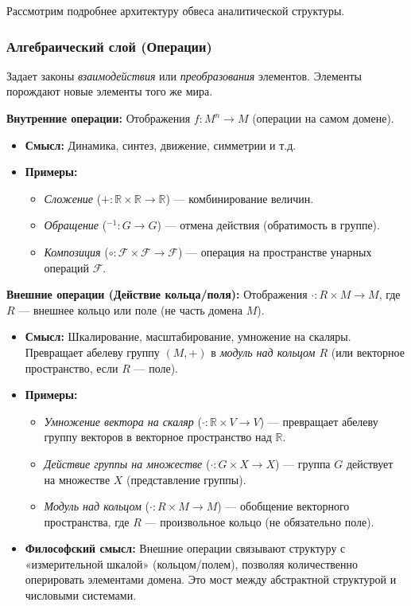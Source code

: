 \documentclass[11pt, a4paper]{extarticle}
\newcommand{\Fcal}{{\mathcal F}}
\newcommand{\R}{{\mathbb R}}
\begin{document}
Рассмотрим подробнее архитектуру обвеса аналитической структуры.

\subsubsection{Алгебраический слой (Операции)}
Задает законы \textit{взаимодействия} или \textit{преобразования} элементов. Элементы порождают новые элементы того же мира.

\textbf{Внутренние операции:} Отображения $f: M^n \to M$ (операции на самом домене).
\begin{itemize}
    \item \textbf{Смысл:} Динамика, синтез, движение, симметрии и т.д.
    \item \textbf{Примеры:}
    \begin{itemize}
        \item \textit{Сложение} ($+: \R \times \R \to \R$) — комбинирование величин.
        \item \textit{Обращение} ($^{-1}: G \to G$) — отмена действия (обратимость в группе).
        \item \textit{Композиция} ($\circ: \Fcal \times \Fcal \to \Fcal$) — операция на пространстве унарных операций $\Fcal$.
    \end{itemize}
\end{itemize}

\textbf{Внешние операции (Действие кольца/поля):} Отображения $\cdot: R \times M \to M$, где $R$ — внешнее кольцо или поле (не часть домена $M$).
\begin{itemize}
    \item \textbf{Смысл:} Шкалирование, масштабирование, умножение на скаляры. Превращает абелеву группу $(M, +)$ в \textit{модуль над кольцом $R$} (или векторное пространство, если $R$ — поле).
    \item \textbf{Примеры:}
    \begin{itemize}
        \item \textit{Умножение вектора на скаляр} ($\cdot: \R \times V \to V$) — превращает абелеву группу векторов в векторное пространство над $\R$.
        \item \textit{Действие группы на множестве} ($\cdot: G \times X \to X$) — группа $G$ действует на множестве $X$ (представление группы).
        \item \textit{Модуль над кольцом} ($\cdot: R \times M \to M$) — обобщение векторного пространства, где $R$ — произвольное кольцо (не обязательно поле).
    \end{itemize}
    \item \textbf{Философский смысл:} Внешние операции связывают структуру с «измерительной шкалой» (кольцом/полем), позволяя количественно оперировать элементами домена. Это мост между абстрактной структурой и числовыми системами.
\end{itemize}
\end{document}
